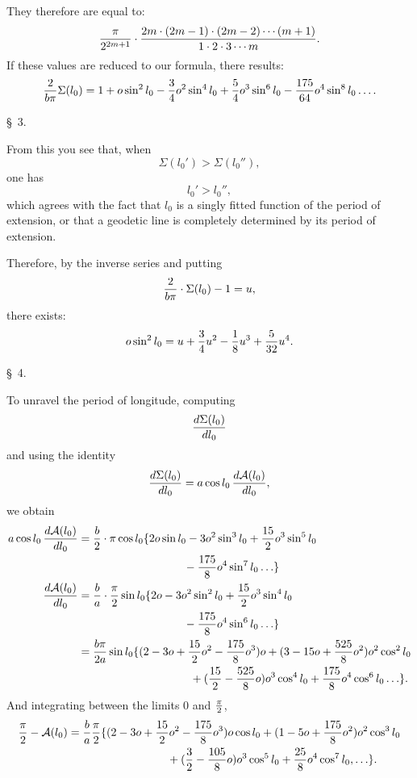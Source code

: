 They therefore are equal to:
\[
 {\pi\over 2^{2m+1}}\cdot
 {2m\cdot(2m-1)\cdot(2m-2)\cdots(m+1)\over 1\cdot2\cdot3\cdots m}.
\]
If these values are reduced to our formula, there results:
\[
 {2\over b\pi}\Sigma(l_0)=1+o\sin^2l_0-{3\over4}o^2\sin^4l_0+{5\over4}o^3\sin^6l_0-{175\over64}o^4\sin^8l_0\ldots .
\]

\begin{center}\S\ 3.\end{center}

From this you see that, when
\[
 \Sigma(l_0')>\Sigma(l_0''),
\]
one has
\[
 l_0'>l_0'',
\]
which agrees with the fact that $l_0$ is a singly fitted function of the period of extension, or that a geodetic line is completely determined by its period of extension.

Therefore, by the inverse series and putting
\[
 {2\over b\pi}\cdot\Sigma(l_0)-1=u,
\]
there exists:
\[
 o\sin^2l_0=u+{3\over4}u^2-{1\over8}u^3+{5\over32}u^4.
\]

\begin{center}\S\ 4.\end{center}

To unravel the period of longitude, computing
\[
 {d\Sigma(l_0)\over dl_0}
\]
and using the identity
\[
 {d\Sigma(l_0)\over dl_0}=a\cos l_0\,{d\mathcal A(l_0)\over dl_0},
\]
we obtain
\[
\begin{aligned}
 a\cos l_0\,{d\mathcal A(l_0)\over dl_0}
 &= {b\over2}\cdot\pi\cos l_0\{2o\sin l_0-3o^2\sin^3l_0+{15\over2}o^3\sin^5l_0\\
 &\hspace{33mm}{}-{175\over8}o^4\sin^7l_0\ldots\}\\
 {d\mathcal A(l_0)\over dl_0}
 &= {b\over a}\cdot{\pi\over2}\sin l_0\{2o-3o^2\sin^2l_0+{15\over2}o^3\sin^4l_0\\
 &\hspace{33mm}{}-{175\over8}o^4\sin^6l_0\ldots\}\\
 &= {b\pi\over2a}\sin l_0\{(2-3o+{15\over2}o^2-{175\over8}o^3)o+(3-15o+{525\over8}o^2)o^2\cos^2l_0\\
 &\hspace{35mm}{}+({15\over2}-{525\over8}o)o^3\cos^4l_0+{175\over8}o^4\cos^6l_0\ldots\}.
\end{aligned}
\]
And integrating between the limits $0$ and ${\pi\over2}$,
\[
\begin{aligned}
 {\pi\over2}-\mathcal A(l_0)&={b\over a}{\pi\over2}\{(2-3o+{15\over2}o^2-{175\over8}o^3)o\cos l_0+(1-5o+{175\over8}o^2)o^2\cos^3l_0\\
&\hspace{31mm}{}+({3\over2}-{105\over8}o)o^3\cos^5l_0+{25\over8}o^4\cos^7l_0,\ldots\}.
\end{aligned}
\]

